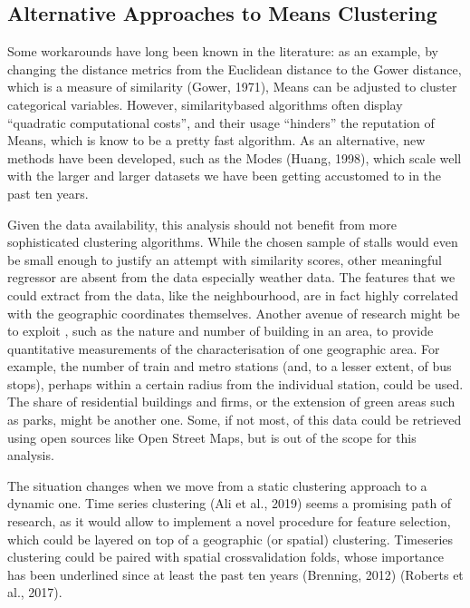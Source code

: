 \documentclass[letterpaper,10pt,english]{jupyterBook}
\begin{document}
\subsection{Alternative Approaches to \sphinxhyphen{}Means Clustering}
\label{\detokenize{04-stations_kmeans:alternative-approaches-to-k-means-clustering}}
\sphinxAtStartPar
Some workarounds have long been known in the literature: as an example, by changing the distance metrics from the Euclidean distance to the Gower distance, which is a measure of similarity (Gower, 1971), \sphinxhyphen{}Means can be adjusted to cluster categorical variables. However, similarity\sphinxhyphen{}based algorithms often display “quadratic computational costs”, and their usage “hinders” the reputation of \sphinxhyphen{}Means, which is know to be a pretty fast algorithm. As an alternative, new methods have been developed, such as the \sphinxhyphen{}Modes (Huang, 1998), which scale well with the larger and larger datasets we have been getting accustomed to in the past ten years.

\sphinxAtStartPar
Given the data availability, this analysis should not benefit from more sophisticated clustering algorithms. While the chosen sample of stalls would even be small enough to justify an attempt with similarity scores, other meaningful regressor are absent from the data \sphinxhyphen{} especially weather data. The features that we could extract from the data, like the neighbourhood, are in fact highly correlated with the geographic coordinates themselves. Another avenue of research might be to exploit , such as the nature and number of building in an area, to provide quantitative measurements of the characterisation of one geographic area. For example, the number of train and metro stations (and, to a lesser extent, of bus stops), perhaps within a certain radius from the individual station, could be used. The share of residential buildings and firms, or the extension of green areas such as parks, might be another one. Some, if not most, of this data could be retrieved using open sources like Open Street Maps, but is out of the scope for this analysis.

\sphinxAtStartPar
The situation changes when we move from a static clustering approach to a dynamic one. Time series clustering (Ali et al., 2019) seems a promising path of research, as it would allow to implement a novel procedure for feature selection, which could be layered on top of a geographic (or spatial) clustering. Time\sphinxhyphen{}series clustering could be paired with spatial cross\sphinxhyphen{}validation folds, whose importance has been underlined since at least the past ten years (Brenning, 2012) (Roberts et al., 2017).
\end{document}
